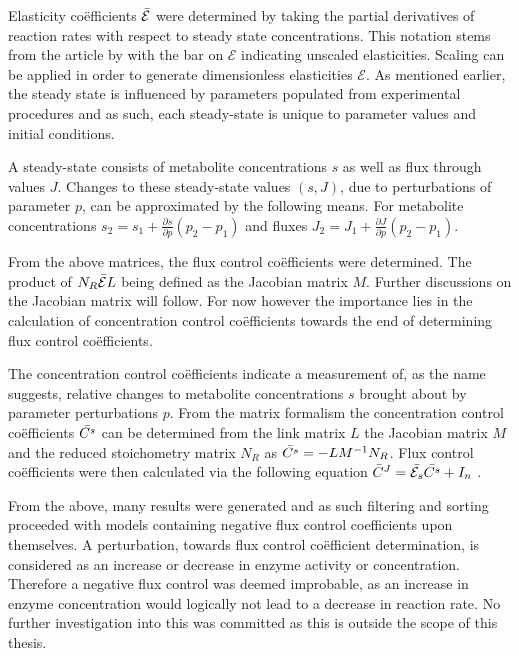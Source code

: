 Elasticity co\"efficients $\Bar{\mathcal{E}}$ were determined by taking the partial derivatives of reaction rates with respect to steady state concentrations. This notation stems from the article by \citeauthor{Hofmeyr2001} with the bar on $\mathcal{E}$ indicating unscaled elasticities. Scaling can be applied in order to generate dimensionless elasticities $\mathcal{E}$. As mentioned earlier, the steady state is influenced by parameters populated from experimental procedures and as such, each steady-state is unique to parameter values and initial conditions. 

A steady-state consists of metabolite concentrations $s$ as well as flux through values $J$. Changes to these steady-state values $(s,J)$, due to perturbations of parameter $p$, can be approximated by the following means. For metabolite concentrations $s_2 = s_1 + \frac{\partial s}{\partial p}(p_2 - p_1)$ and fluxes $J_2 = J_1 + \frac{\partial J}{\partial p}(p_2 - p_1)$. 

From the above matrices, the flux control co\"efficients were determined. The product of $N_R\Bar{\mathcal{E}}L$ being defined as the Jacobian matrix $M$. Further discussions on the Jacobian matrix will follow. For now however the importance lies in the calculation of concentration control co\"efficients towards the end of determining flux control co\"efficients.

The concentration control co\"efficients indicate a measurement of, as the name suggests, relative changes to metabolite concentrations $s$ brought about by parameter perturbations $p$. From the matrix formalism the concentration control co\"efficients $\Bar{C^s}$ can be determined from the link matrix $L$ the Jacobian matrix $M$ and the reduced stoichometry matrix $N_R$ as $\Bar{C^s}=-LM^{-1}N_R$. Flux control co\"efficients were then calculated via the following equation $\Bar{C}^J = \Bar{\mathcal{E}_s}\Bar{C^s}+ I_n$ \cite{Hofmeyr2001}.

From the above, many results were generated and as such filtering and sorting proceeded with models containing negative flux control coefficients upon themselves. A perturbation, towards flux control co\"efficient determination, is considered as an increase or decrease in enzyme activity or concentration. Therefore a negative flux control was deemed improbable, as an increase in enzyme concentration would logically not lead to a decrease in reaction rate. No further investigation into this was committed as this is outside the scope of this thesis.

